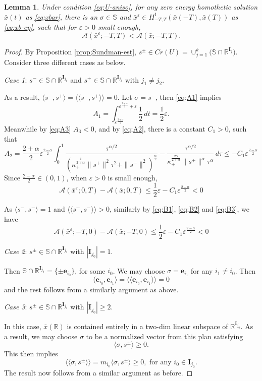\documentclass[11pt]{amsart}
\newcommand{\rr}{\mathbb R}
\newcommand{\A}{\mathcal A}
\newcommand{\bs}{\mathbb S}
\newcommand{\ee}{\mathbf e}
\newcommand{\I}{\mathbf I}
\newcommand{\al}{\alpha}
\newcommand{\ep}{\varepsilon}
\newcommand{\sg}{\sigma}
\newcommand{\kp}{\kappa}
\newcommand{\ey}{\frac{1}{2}}
\newcommand{\pwb}{\frac{2 +\al}{2}}
\newcommand{\xb}{\bar{x}}
\def\me#1{\langle\!\langle #1 \rangle\!\rangle}
\theoremstyle{plain}
\newtheorem{lem}{Lemma}[section]
\theoremstyle{definition}
\theoremstyle{remark}
\begin{document}
 
\begin{lem}
\label{lem;homothetic-not-minimizer} Under condition \eqref{eq;U-aniso}, for any zero energy homothetic solution $\xb(t)$ as \eqref{eq;xbar}, there is an $\sg \in \bs$ and $\xb^{\ep} \in H^1_{-T, T}(\xb(-T), \xb(T))$ as \eqref{eq;xb-ep}, such that for $\ep>0$ small enough,
$$ \A(\xb^{\ep}; -T, T) < \A(\xb; -T, T).$$
\end{lem}

\begin{proof}
By Proposition \ref{prop;Sundman-est}, $s^{\pm} \in Cr(U)=\cup_{j =1}^k \Big( \bs \cap \rr^{\I_j} \Big)$. Consider three different cases as below. 

\emph{Case 1}: $s^- \in \bs \cap \rr^{\I_{j_1}}$ and $s^+ \in \bs \cap \rr^{\I_{j_2}} \text{ with } j_1 \ne j_2.$

As a result, $\langle s^-, s^+ \rangle = \me{s^-, s^+}=0$. Let $\sg = s^-$, then \eqref{eq;A1} implies
$$ A_1 = \int_{\ep^{\pwb}}^{\ep^{\pwb}+\ep}  \ey \,dt = \ey \ep. $$
Meanwhile by \eqref{eq;A3} $A_3 < 0$, and by \eqref{eq;A2}, there is a constant $C_1 >0$, such that 
$$ 
A_2 = \frac{2+\al}{2} \ep^{\frac{2 -\al}{2}} \int_0^1 \frac{\tau^{\al/2}}{\left( \kp_+^{\frac{4}{2+\al}} \|s^+\|^2 \tau^2 + \|s^-\|^2 \right)^{\frac{\al}{2}}} - \frac{\tau^{\al/2}}{\kp_+^{\frac{2\al}{2 +\al}} \|s^+\|^{\al} \tau^{\al}} \,d\tau \le -C_1 \ep^{\frac{2-\al}{2}}
$$
Since $\frac{2-\al}{2} \in (0, 1)$, when $\ep>0$ is small enough, 
$$ \A(\xb^{\ep};0, T) -\A(\xb; 0, T) \le \ey \ep - C_1 \ep^{\frac{2-\al}{2}} < 0$$

As $\langle s^-, s^-\rangle =1$ and $\me{s^-, s^-} >0$, similarly by \eqref{eq;B1}, \eqref{eq;B2} and \eqref{eq;B3}, we have 
$$ \A(\xb^{\ep};-T, 0) -\A(\xb; -T, 0) \le \ey \ep - C_1 \ep^{\frac{2-\al}{2}} < 0$$

\emph{Case 2}: $s^{\pm} \in \bs \cap \rr^{\I_{j_0}}$ with $|\I_{j_0}|=1$. 

Then  $\bs \cap \rr^{\I_{j_0}} = \{ \pm \ee_{i_0} \}$, for some $i_0$. We may choose $\sg = \ee_{i_1}$ for any $i_1 \ne i_0$. Then 
$$ \langle \ee_{i_0}, \ee_{i_1} \rangle = \me{\ee_{i_0}, \ee_{i_1}} =0$$
and the rest follows from a similarly argument as above.

\emph{Case 3}: $s^{\pm} \in \bs \cap \rr^{\I_{j_0}}$ with  $|\I_{j_0}| \ge 2$. 

In this case, $\xb(\rr)$ is contained entirely in a two-dim linear subspace of $\rr^{\I_{j_0}}$. As a result, we may choose $\sg$ to be a normalized vector from this plan satisfying
$$ \langle \sg, s^{\pm} \rangle \ge 0.$$
This then implies 
$$ \me{\sg, s^{\pm}} = m_{i_0} \langle \sg, s^{\pm} \rangle \ge 0, \text{ for any } i_0 \in \I_{j_0}.$$
The result now follows from a similar argument as before. 
\end{proof}
\end{document}
